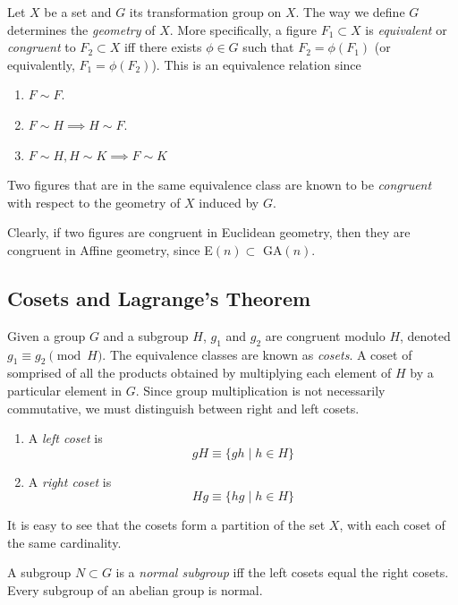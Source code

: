 \documentclass{article}
\begin{document}
  \begin{definition}
    Let $X$ be a set and $G$ its transformation group on $X$. The way we define $G$ determines the \textit{geometry} of $X$. More specifically, a figure $F_{1} \subset X$ is \textit{equivalent} or \textit{congruent} to $F_{2} \subset X$ iff there exists $\phi \in G$ such that $F_{2} = \phi (F_{1})$ (or equivalently, $F_{1} = \phi (F_{2})$). This is an equivalence relation since
    \begin{enumerate}
      \item $F \sim F$. 
      \item $F \sim H \implies H \sim F$. 
      \item $F \sim H, H \sim K \implies F \sim K$
    \end{enumerate}
    Two figures that are in the same equivalence class are known to be \textit{congruent} with respect to the geometry of $X$ induced by $G$. 
  \end{definition}

  Clearly, if two figures are congruent in Euclidean geometry, then they are congruent in Affine geometry, since E$(n) \subset$ GA$(n)$. 

\subsection{Cosets and Lagrange's Theorem}

  \begin{definition}
    Given a group $G$ and a subgroup $H$, $g_1$ and $g_2$ are congruent modulo $H$, denoted $g_1 \equiv g_2 \pmod{H}$. The equivalence classes are known as \textit{cosets}. A coset of somprised of all the products obtained by multiplying each element of $H$ by a particular element in $G$. Since group multiplication is not necessarily commutative, we must distinguish between right and left cosets. 
    \begin{enumerate}
      \item A \textit{left coset} is 
      \[ g H \equiv \{g h \;| \;h \in H \} \]
      \item A \textit{right coset} is 
      \[H g \equiv \{h g \;|\; h \in H \} \]
    \end{enumerate}
    It is easy to see that the cosets form a partition of the set $X$, with each coset of the same cardinality. 
  \end{definition}

  \begin{definition}
    A subgroup $N \subset G$ is a \textit{normal subgroup} iff the left cosets equal the right cosets. Every subgroup of an abelian group is normal. 
  \end{definition}
\end{document}
